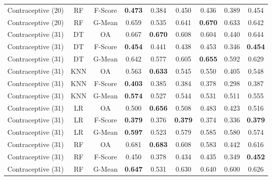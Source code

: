 \begin{longtable}{ccccccccc}
Contraceptive (20) &         RF & F-Score & \textbf{0.473} &          0.384 &          0.450 &          0.436 &          0.389 &          0.454 \\
Contraceptive (20) &         RF &  G-Mean &          0.659 &          0.535 &          0.641 & \textbf{0.670} &          0.633 &          0.642 \\
Contraceptive (31) &         DT &      OA &          0.667 & \textbf{0.670} &          0.608 &          0.604 &          0.440 &          0.644 \\
Contraceptive (31) &         DT & F-Score & \textbf{0.454} &          0.441 &          0.438 &          0.453 &          0.346 & \textbf{0.454} \\
Contraceptive (31) &         DT &  G-Mean &          0.642 &          0.577 &          0.605 & \textbf{0.655} &          0.592 &          0.629 \\
Contraceptive (31) &        KNN &      OA &          0.563 & \textbf{0.633} &          0.545 &          0.550 &          0.405 &          0.548 \\
Contraceptive (31) &        KNN & F-Score & \textbf{0.403} &          0.385 &          0.384 &          0.378 &          0.298 &          0.387 \\
Contraceptive (31) &        KNN &  G-Mean & \textbf{0.574} &          0.527 &          0.544 &          0.531 &          0.511 &          0.555 \\
Contraceptive (31) &         LR &      OA &          0.500 & \textbf{0.656} &          0.508 &          0.483 &          0.423 &          0.516 \\
Contraceptive (31) &         LR & F-Score & \textbf{0.379} &          0.376 & \textbf{0.379} &          0.374 &          0.336 & \textbf{0.379} \\
Contraceptive (31) &         LR &  G-Mean & \textbf{0.597} &          0.523 &          0.579 &          0.585 &          0.580 &          0.574 \\
Contraceptive (31) &         RF &      OA &          0.681 & \textbf{0.683} &          0.608 &          0.583 &          0.442 &          0.616 \\
Contraceptive (31) &         RF & F-Score &          0.450 &          0.378 &          0.434 &          0.435 &          0.349 & \textbf{0.452} \\
Contraceptive (31) &         RF &  G-Mean & \textbf{0.647} &          0.531 &          0.630 &          0.640 &          0.600 &          0.626 \\

\end{longtable}
